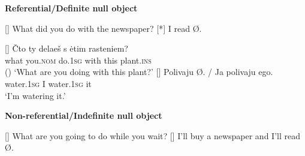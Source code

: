 \documentclass[output=paper,modfonts,newtxmath,hidelinks,]{langscibook}
\begin{document}
\begin{exe}
\ex \textbf{Referential/Definite null object}\label{17:ex1}
\begin{xlist}
\ex\label{17:ex1a}
\begin{xlist}
[]{
	\glt What did you do with the newspaper?
    }
[*]{
    \glt I read Ø.
        }
\end{xlist}
\ex\label{17:ex1b}
\begin{xlist}
[]{
	\gll 
    	 Čto ty delaeš s ėtim rasteniem?\\
         what you.\textsc{nom} do.\textsc{1sg} with this plant.\textsc{ins}\\\hfill()
	\glt `What are you doing with this plant?'
    }
[]{
    \gll 
    	 Polivaju Ø. / Ja polivaju ego.\\
         water.\textsc{1sg} {} {} I water.\textsc{1sg} it\\
	\glt `I’m watering it.'
        }
\end{xlist}
\end{xlist}
\end{exe}

\begin{exe}
\ex \textbf{Non-referential/Indefinite null object}\label{17:ex2}
\begin{xlist}
[]{
	\glt What are you going to do while you wait?
    }
[]{
    \glt I’ll buy a newspaper and I’ll read Ø.
        }
\end{xlist}
\end{exe}
\end{document}
